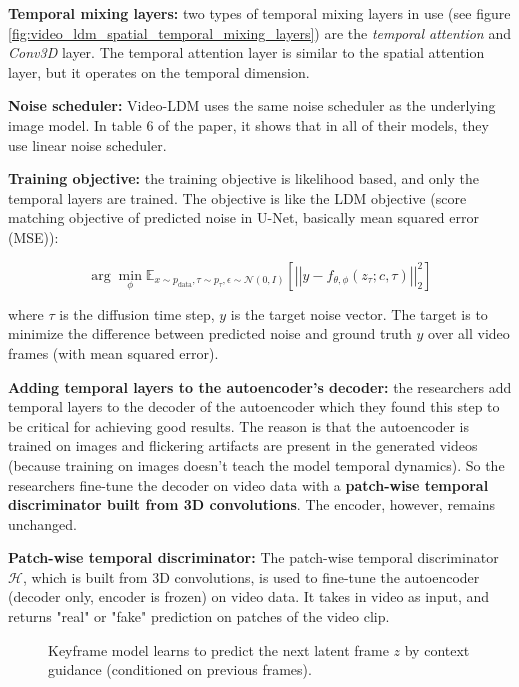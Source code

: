 \textbf{Temporal mixing layers:} two types of temporal mixing layers in use (see figure \ref{fig:video_ldm_spatial_temporal_mixing_layers}) are the \textit{temporal attention} and \textit{Conv3D} layer. The temporal attention layer is similar to the spatial attention layer, but it operates on the temporal dimension.

\textbf{Noise scheduler:} Video-LDM uses the same noise scheduler as the underlying image model. In table 6 of the paper, it shows that in all of their models, they use linear noise scheduler.

\textbf{Training objective:} the training objective is likelihood based, and only the temporal layers are trained. The objective is like the LDM objective (score matching objective of predicted noise in U-Net, basically mean squared error (MSE)):

\[ \arg \min_\phi \mathbb{E}_{x \sim p_{\text{data}}, \tau \sim p_{\tau}, \epsilon \sim \mathcal{N} (0, I)} \left[ \left| \left| y - f_{\theta,\phi} (z_{\tau} ; c, \tau) \right| \right|^2_2 \right] \]

where $\tau$ is the diffusion time step, $y$ is the target noise vector. The target is to minimize the difference between predicted noise and ground truth $y$ over all video frames (with mean squared error).

\textbf{Adding temporal layers to the autoencoder's decoder:} the researchers add temporal layers to the decoder of the autoencoder which they found this step to be critical for achieving good results. The reason is that the autoencoder is trained on images and flickering artifacts are present in the generated videos (because training on images doesn't teach the model temporal dynamics). So the researchers fine-tune the decoder on video data with a \textbf{patch-wise temporal discriminator built from 3D convolutions}. The encoder, however, remains unchanged.

\textbf{Patch-wise temporal discriminator:} The patch-wise temporal discriminator $\mathcal{H}$, which is built from 3D convolutions, is used to fine-tune the autoencoder (decoder only, encoder is frozen) on video data. It takes in video as input, and returns "real" or "fake" prediction on patches of the video clip.


\begin{figure}
    \centering
    \scalebox{0.5}{
        
    }
    \caption{Keyframe model learns to predict the next latent frame $z$ by context guidance (conditioned on previous frames).}
\end{figure}


